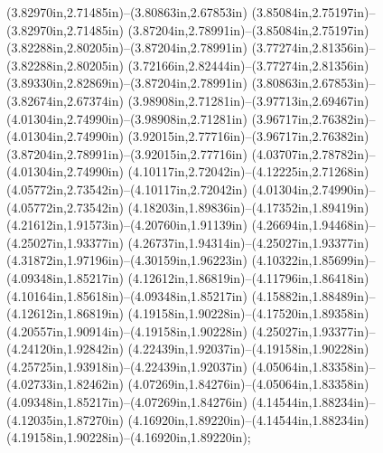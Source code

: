 (3.82970in,2.71485in)--(3.80863in,2.67853in) (3.85084in,2.75197in)--(3.82970in,2.71485in) (3.87204in,2.78991in)--(3.85084in,2.75197in) (3.82288in,2.80205in)--(3.87204in,2.78991in) (3.77274in,2.81356in)--(3.82288in,2.80205in) (3.72166in,2.82444in)--(3.77274in,2.81356in) (3.89330in,2.82869in)--(3.87204in,2.78991in) (3.80863in,2.67853in)--(3.82674in,2.67374in) (3.98908in,2.71281in)--(3.97713in,2.69467in) (4.01304in,2.74990in)--(3.98908in,2.71281in) (3.96717in,2.76382in)--(4.01304in,2.74990in) (3.92015in,2.77716in)--(3.96717in,2.76382in) (3.87204in,2.78991in)--(3.92015in,2.77716in) (4.03707in,2.78782in)--(4.01304in,2.74990in) (4.10117in,2.72042in)--(4.12225in,2.71268in) (4.05772in,2.73542in)--(4.10117in,2.72042in) (4.01304in,2.74990in)--(4.05772in,2.73542in) (4.18203in,1.89836in)--(4.17352in,1.89419in) (4.21612in,1.91573in)--(4.20760in,1.91139in) (4.26694in,1.94468in)--(4.25027in,1.93377in) (4.26737in,1.94314in)--(4.25027in,1.93377in) (4.31872in,1.97196in)--(4.30159in,1.96223in) (4.10322in,1.85699in)--(4.09348in,1.85217in) (4.12612in,1.86819in)--(4.11796in,1.86418in) (4.10164in,1.85618in)--(4.09348in,1.85217in) (4.15882in,1.88489in)--(4.12612in,1.86819in) (4.19158in,1.90228in)--(4.17520in,1.89358in) (4.20557in,1.90914in)--(4.19158in,1.90228in) (4.25027in,1.93377in)--(4.24120in,1.92842in) (4.22439in,1.92037in)--(4.19158in,1.90228in) (4.25725in,1.93918in)--(4.22439in,1.92037in) (4.05064in,1.83358in)--(4.02733in,1.82462in) (4.07269in,1.84276in)--(4.05064in,1.83358in) (4.09348in,1.85217in)--(4.07269in,1.84276in) (4.14544in,1.88234in)--(4.12035in,1.87270in) (4.16920in,1.89220in)--(4.14544in,1.88234in) (4.19158in,1.90228in)--(4.16920in,1.89220in);
